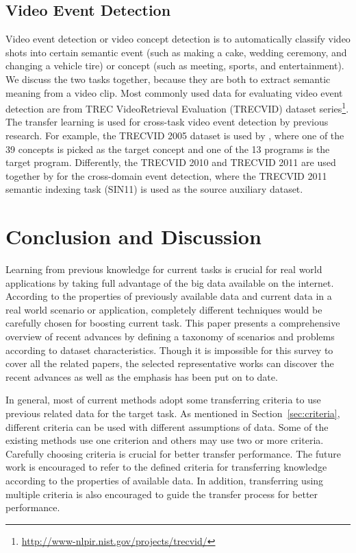 \documentclass[prodmode]{acmsmall}  %
\begin{document}
\subsection{Video Event Detection}
Video event detection or video concept detection is to automatically classify video shots into certain semantic event (such as making a cake, wedding ceremony, and changing a vehicle tire) or concept (such as meeting, sports, and entertainment). We discuss the two tasks together, because they are both to extract semantic meaning from a video clip. Most commonly used data for evaluating video event detection are from TREC VideoRetrieval Evaluation (TRECVID) dataset series\footnote{\url{http://www-nlpir.nist.gov/projects/trecvid/}}. The transfer learning is used for cross-task video event detection by previous research. For example, the TRECVID 2005 dataset is used by , where one of the 39 concepts is picked as the target concept and one of the 13 programs is the target program. Differently, the TRECVID 2010 and TRECVID 2011 are used together by  for the cross-domain event detection, where the TRECVID 2011 semantic indexing task (SIN11) is used as the source auxiliary dataset.


\section{Conclusion and Discussion}
\label{sec:Conc}
Learning from previous knowledge for current tasks is crucial for real world applications by taking full advantage of the big data available on the internet. According to the properties of previously available data and current data in a real world scenario or application, completely different techniques would be carefully chosen for boosting current task.
This paper presents a comprehensive overview of recent advances by defining a taxonomy of scenarios and problems according to dataset characteristics.  Though it is impossible for this survey to cover all the related papers, the selected representative works can discover the recent advances as well as the emphasis has been put on to date.

In general, most of current methods adopt some transferring criteria to use previous related data for the target task. As mentioned in Section~\ref{sec:criteria}, different criteria can be used with different assumptions of data. Some of the existing methods use one criterion and others may use two or more criteria. Carefully choosing criteria is crucial for better transfer performance. The future work is encouraged to refer to the defined criteria for transferring knowledge according to the properties of available data. In addition, transferring using multiple criteria is also encouraged to guide the transfer process for better performance.
\end{document}
